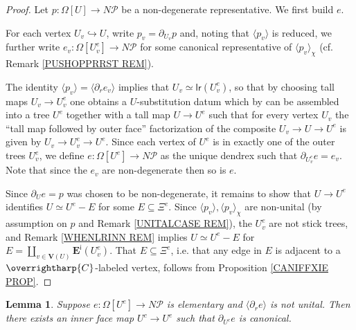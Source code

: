 \documentclass[a4paper,10pt
,draft
]{article}%
\numberwithin{equation}{section}
\numberwithin{figure}{section}
\newtheorem{lemma}[equation]{Lemma}%
\theoremstyle{definition} %
\newcommand{\vect}[1]{\text{\overrightharp{\ensuremath{#1}}}}
\newcommand{\1}{\ensuremath{\mathbbm 1}}%
\begin{document}
\begin{proof}
	Let $p\colon \Omega[U] \to N \mathcal{P}$
	be a non-degenerate representative. We first build $e$.
	
	For each vertex $U_v \hookrightarrow U$, write
	$p_v = \partial_{U_v} p$
	and,
	noting that $\langle p_v \rangle$ is reduced,
	we further write 
	$e_v \colon \Omega[U^e_v] \to N \mathcal{P}$
	for some canonical representative of 
	$\langle p_v \rangle_{\chi}$
	(cf. Remark \ref{PUSHOPPRRST REM}).
	
	
	The identity
	$\langle p_v \rangle = \langle \partial_r e_v \rangle$
	implies that
	$U_v \simeq \mathsf{lr}(U^e_v)$,
	so that by choosing tall maps $U_v \to U^e_v$ 
	one obtains a $U$-substitution datum
	\cite[Def. 3.38]{BP_geo}
	which by 
	\cite[Prop. 3.41]{BP_geo}
	can be assembled into a tree $U^e$
	together with a tall map
	$U \to U^e$ such that for every vertex $U_v$
	the ``tall map followed by outer face'' factorization of
	the composite
	$U_v \to U \to U^e$
	is given by
	$U_v \to U^e_v \to U^e$.
	Since each vertex of $U^e$ is in exactly one of the outer trees $U^e_v$,
	we define $e \colon \Omega[U^e] \to N \mathcal{P}$
	as the unique dendrex such that
	$\partial_{U^e_v} e = e_v$.
	Note that since the $e_v$ are non-degenerate 
	then so is $e$.
	
	
	Since $\partial_{U}e = p$ was chosen to be non-degenerate,
	it remains to show that
	$U \to U^e$ identifies $U \simeq U^e - E$
	for some $E \subseteq \Xi^{e}$.
	Since $\langle p_v \rangle, \langle p_v \rangle_{\chi}$ are non-unital
	(by assumption on $p$ and Remark \ref{UNITALCASE REM}),
	the $U^e_v$ are not stick trees,
	and Remark \ref{WHENLRINN REM} implies
	$U \simeq U^e-E$ for 
	$E = \amalg_{v \in \boldsymbol{V}(U)} \boldsymbol{E}^{\mathsf{i}}(U^e_v)$.
	That
	$E \subseteq \Xi^{e}$, i.e. that any edge in $E$ is adjacent to a $\vect{C}$-labeled vertex,
	follows from Proposition \ref{CANIFFXIE PROP}.
\end{proof}




\begin{lemma}\label{FORSAKEN LEM}
	Suppose $e \colon \Omega[U^e] \to N \mathcal{P}$ is elementary
	and $\langle \partial_r e\rangle$ is not unital.
	Then there exists an inner face map
	$U^c \to U^e$ such that $\partial_{U^c} e$ is canonical.
\end{lemma}
\end{document}
